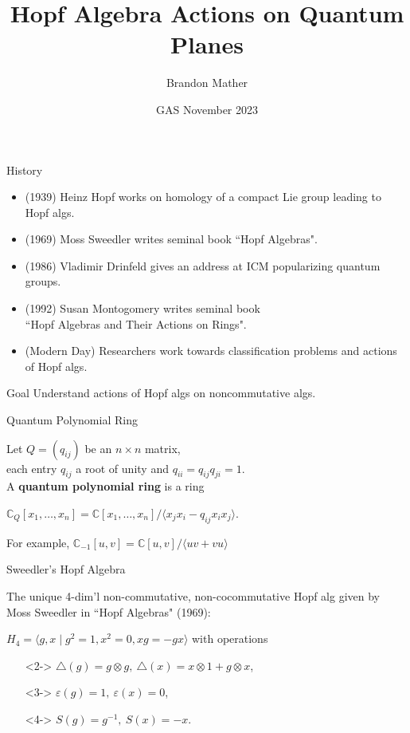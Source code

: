 \documentclass{beamer}
\title{Hopf Algebra Actions on Quantum Planes}
\author{Brandon Mather}
\institute{University of North Texas}
\date{GAS November 2023}
\begin{document}
\maketitle

\begin{frame}{History}

\begin{itemize}
    \item (1939) Heinz Hopf works on homology of a compact Lie group leading to Hopf algs.
    \item (1969) Moss Sweedler writes seminal book ``Hopf Algebras".
    \item (1986) Vladimir Drinfeld gives an address at ICM popularizing quantum groups.
    \item (1992) Susan Montogomery writes seminal book \\``Hopf Algebras and Their Actions on Rings".
    \item (Modern Day) Researchers work towards classification problems and actions of Hopf algs.
\end{itemize}
 \vspace{2ex}
\begin{block}{Goal}
  Understand actions of Hopf algs on noncommutative algs.
\end{block}
\end{frame}

\begin{frame}{Quantum Polynomial Ring}
\begin{definition}
    Let $Q=(q_{ij})$ be an $n\times n$ matrix, \\each entry $q_{ij}$ a root of unity and $q_{ii}=q_{ij}q_{ji}=1$.\\ A \textbf{quantum polynomial ring} is a ring \begin{center}$\mathbb{C}_Q[x_1,
    \ldots,x_n]=\mathbb{C}[x_1,\ldots,x_n]/\langle x_jx_i-q_{ij}x_ix_j\rangle$.\end{center}
\end{definition}

For example, $\mathbb{C}_{-1}[u,v]=\mathbb{C}[u,v]/\langle uv+vu\rangle$
\end{frame}


\begin{frame}{Sweedler's Hopf Algebra}

The unique 4-dim'l non-commutative, non-cocommutative Hopf alg given by Moss Sweedler in ``Hopf Algebras" (1969): \newline

$H_4=\Big\langle g,x\;\vert\;g^2=1,x^2=0,xg=-gx\Big\rangle$ with operations

\vspace{2ex}

\begin{itemize}
\setlength{\itemsep}{2ex}
    \item[]<2-> $\triangle(g)=g\otimes g,\ \triangle(x)=x\otimes 1+g\otimes x$,
    \item[]<3-> $\varepsilon(g)=1,\  \varepsilon(x)=0$,
    \item[]<4-> $S(g)=g^{-1},\ S(x)=-x$.
\end{itemize}


\end{frame}
\end{document}
